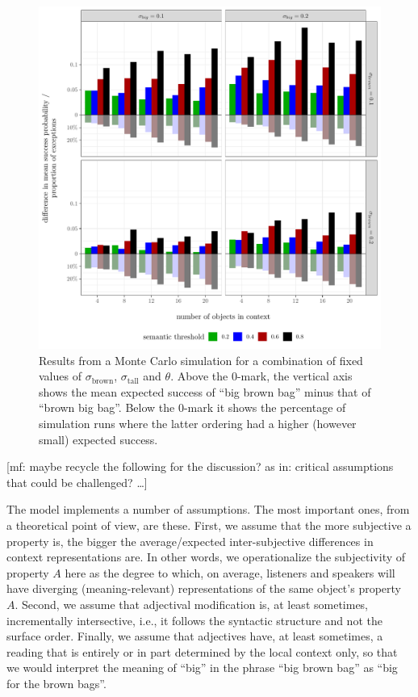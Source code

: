 \documentclass[10pt,a4paper]{article}
\newcommand{\mf}[1]{\textcolor{BrickRed}{[mf: #1]}}
\begin{document}
\begin{figure}
  \centering
  \includegraphics[width = \linewidth]{plots/showcase_results_combined.pdf}
  \caption{Results from a Monte Carlo simulation for a combination of fixed values of $\sigma_{\text{brown}}$, $\sigma_{\text{tall}}$ and $\theta$. Above the 0-mark, the vertical axis shows the mean expected success of ``big brown bag'' minus that of ``brown big bag''. Below the 0-mark it shows the percentage of simulation runs where the latter ordering had a higher (however small) expected success.}
  \label{fig:Showcase_examples}
\end{figure}

\bigskip
\bigskip
\bigskip

\mf{maybe recycle the following for the discussion? as in: critical assumptions that could be challenged? \dots}

The model implements a number of assumptions. The most important ones, from a theoretical point of view, are these. First, we assume that the more subjective a property is, the bigger the average/expected inter-subjective differences in context representations are. In other words, we operationalize the subjectivity of property $A$ here as the degree to which, on average, listeners and speakers will have diverging (meaning-relevant) representations of the same object's property $A$. Second, we assume that adjectival modification is, at least sometimes, incrementally intersective, i.e., it follows the syntactic structure and not the surface order. Finally, we assume that adjectives have, at least sometimes, a reading that is entirely or in part determined by the local context only, so that we would interpret the meaning of ``big''  in the phrase ``big brown bag'' as ``big for the brown bags''.

\bigskip






\setlength{\bibleftmargin}{.125in}
\setlength{\bibindent}{-\bibleftmargin}


\end{document}
